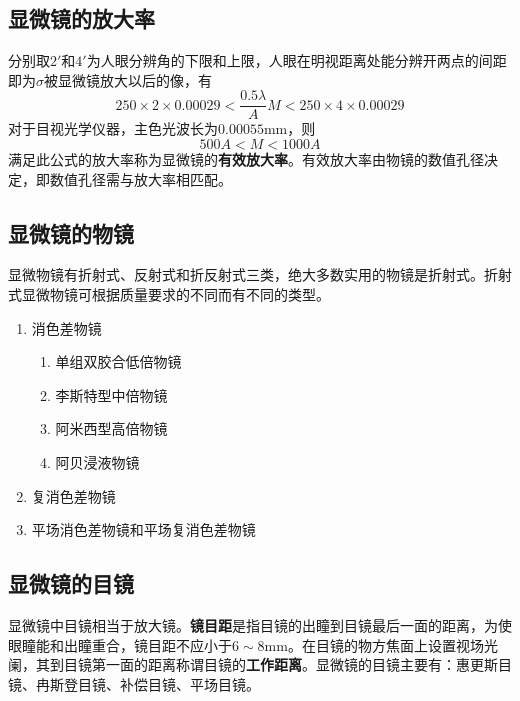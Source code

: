 \subsection{显微镜的放大率}
分别取$2'$和$4'$为人眼分辨角的下限和上限，人眼在明视距离处能分辨开两点的间距即为$\sigma$被显微镜放大以后的像，有
\begin{equation}
250\times2\times0.00029<\frac{0.5\lambda}{A}M<250\times4\times0.00029
\end{equation}
对于目视光学仪器，主色光波长为$0.00055\mathrm{mm}$，则
\begin{equation}
500A<M<1000A
\end{equation}
满足此公式的放大率称为显微镜的\textbf{有效放大率}。有效放大率由物镜的数值孔径决定，即数值孔径需与放大率相匹配。

\subsection{显微镜的物镜}

显微物镜有折射式、反射式和折反射式三类，绝大多数实用的物镜是折射式。折射式显微物镜可根据质量要求的不同而有不同的类型。
\begin{enumerate}
	\item 消色差物镜
	\begin{enumerate}
		\item 单组双胶合低倍物镜
		\item 李斯特型中倍物镜
		\item 阿米西型高倍物镜
		\item 阿贝浸液物镜
	\end{enumerate}
	\item 复消色差物镜
	\item 平场消色差物镜和平场复消色差物镜
\end{enumerate}

\subsection{显微镜的目镜}
显微镜中目镜相当于放大镜。\textbf{镜目距}是指目镜的出瞳到目镜最后一面的距离，为使眼瞳能和出瞳重合，镜目距不应小于$6\sim8\mathrm{mm}$。在目镜的物方焦面上设置视场光阑，其到目镜第一面的距离称谓目镜的\textbf{工作距离}。显微镜的目镜主要有：惠更斯目镜、冉斯登目镜、补偿目镜、平场目镜。


